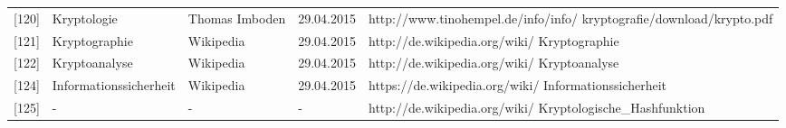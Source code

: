 \documentclass[12pt,a4paper]{report}
\begin{document}
\begin{onehalfspace}
\begin{singlespace}
\begin{tabular}{| m{7mm} | m{40mm} | m{20mm} | m{27mm} | m{65mm} |}
{[}120{]} & Kryptologie & Thomas Imboden & 29.04.2015 & http://www.tinohempel.de/info/info/ kryptografie/download/krypto.pdf\\
{[}121{]} & Kryptographie & Wikipedia & 29.04.2015 & http://de.wikipedia.org/wiki/ Kryptographie\\
{[}122{]} & Kryptoanalyse & Wikipedia & 29.04.2015 & http://de.wikipedia.org/wiki/ Kryptoanalyse\\
{[}124{]} & Informationssicherheit & Wikipedia & 29.04.2015 & https://de.wikipedia.org/wiki/ Informationssicherheit\\
{[}125{]} & - & - & - & http://de.wikipedia.org/wiki/ Kryptologische\_Hashfunktion

\end{tabular}
\end{singlespace}


\nocite{*}

\end{onehalfspace}
\end{document}
